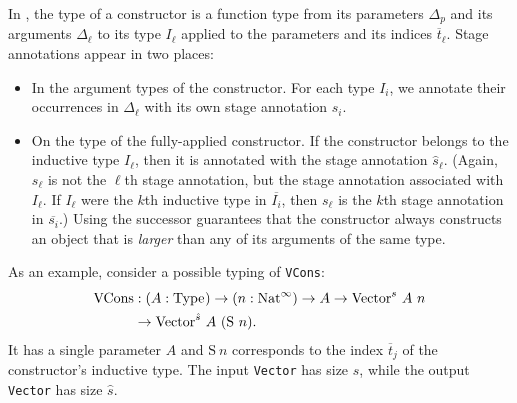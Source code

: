 \documentclass[nonacm,screen,10pt]{acmart}
\begin{document}
In , the type of a constructor is a function type from its parameters $\Delta_p$ and its arguments $\Delta_\ell$ to its \coinductive type $I_\ell$ applied to the parameters and its indices $\overline{t}_\ell$. Stage annotations appear in two places:
\begin{itemize}
    \item In the argument types of the constructor. For each \coinductive type $I_i$, we annotate their occurrences in $\Delta_\ell$ with its own stage annotation $s_i$.
    \item On the \coinductive type of the fully-applied constructor. If the constructor belongs to the inductive type $I_\ell$, then it is annotated with the stage annotation $\hat{s}_\ell$. (Again, $s_\ell$ is not the $\ell$th stage annotation, but the stage annotation associated with $I_\ell$. If $I_\ell$ were the $k$th inductive type in $\overline{I_i}$, then $s_\ell$ is the $k$th stage annotation in $\overline{s_i}$.) Using the successor guarantees that the constructor always constructs an object that is \textit{larger} than any of its arguments of the same type.
\end{itemize}
As an example, consider a possible typing of \texttt{VCons}:
\begin{align*}
\text{VCons} &: (A: \text{Type}_{}) \to (n:\text{Nat}^\infty) \to A \to \text{Vector}^s\ A\ n \\
&\to \text{Vector}^{\hat{s}}\ A\ (\text{S}\ n).
\end{align*}
It has a single parameter $A$ and $\text{S}\ n$ corresponds to the index $\overline{t}_j$ of the constructor's inductive type. The input \texttt{Vector} has size $s$, while the output \texttt{Vector} has size $\hat{s}$.
\end{document}
